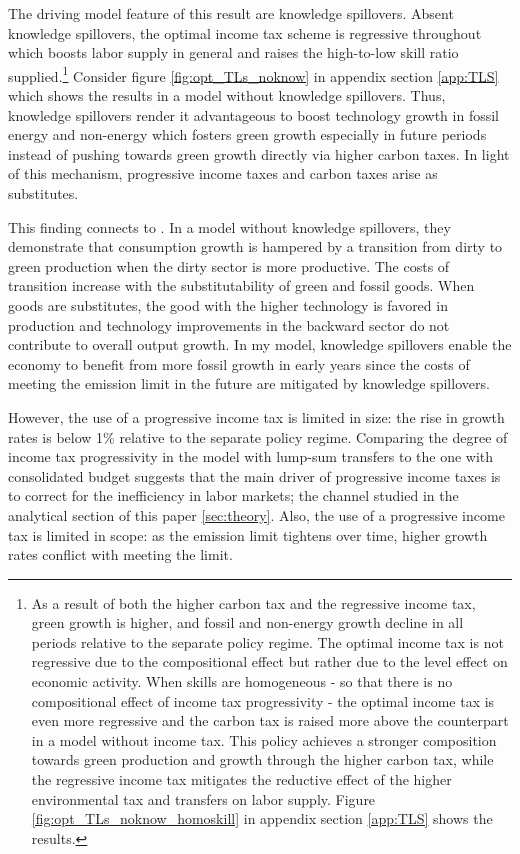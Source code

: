 The driving model feature of this result are knowledge spillovers. Absent knowledge spillovers, the optimal income tax scheme is regressive throughout which boosts labor supply in general and raises the high-to-low skill ratio supplied.\footnote{As a result of both the higher carbon tax and the regressive income tax, green growth is higher, and fossil and non-energy growth decline in all periods relative to the separate policy regime.  The optimal income tax is not regressive due to the compositional effect but rather due to the level effect on economic activity. When skills are homogeneous - so that there is no compositional effect of income tax progressivity - the optimal income tax is even more regressive and the carbon tax is raised more above the counterpart in a model without income tax. This policy achieves a stronger composition towards green production and growth through the higher carbon tax, while the regressive income tax mitigates the reductive effect of the higher environmental tax and transfers on labor supply. Figure \ref{fig:opt_TLs_noknow_homoskill} in appendix section \ref{app:TLS} shows the results.} Consider figure \ref{fig:opt_TLs_noknow} in appendix section \ref{app:TLS} which shows the results in a model without knowledge spillovers.
Thus, knowledge spillovers render it advantageous to boost technology growth in fossil energy and non-energy which fosters green growth especially in future periods instead of pushing towards green growth directly via higher carbon taxes. In light of this mechanism, progressive income taxes and carbon taxes arise as substitutes. 

This finding connects to \cite{Acemoglu2012TheChange}.  In a model without knowledge spillovers, they demonstrate that consumption growth is hampered by a transition from dirty to green production when the dirty sector is more productive. The costs of transition increase with the substitutability of green and fossil goods. When goods are substitutes, the good with the higher technology is favored in production and technology improvements in the backward sector do not contribute to overall output growth.
In my model, knowledge spillovers enable the economy to benefit from more fossil growth in early years since the costs of meeting the emission limit in the future are mitigated by knowledge spillovers. 

However, the use of a progressive income tax is limited in size: the rise in growth rates is below 1\% relative to the separate policy regime. Comparing the degree of income tax progressivity in the model with lump-sum transfers to the one with consolidated budget suggests that the main driver of progressive income taxes is to correct for the inefficiency in labor markets; the channel studied in the analytical section of this paper \ref{sec:theory}. 
Also, the use of a progressive income tax is limited in scope: as the emission limit tightens over time, higher growth rates conflict with meeting the limit. 

